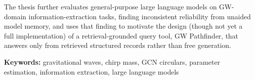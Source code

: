 The thesis further evaluates general-purpose large language models on GW-domain information-extraction tasks, finding inconsistent reliability from unaided model memory, and uses that finding to motivate the design (though not yet a full implementation) of a retrieval-grounded query tool, GW Pathfinder, that answers only from retrieved structured records rather than free generation.

\textbf{Keywords:} gravitational waves, chirp mass, GCN circulars, parameter estimation, information extraction, large language models
